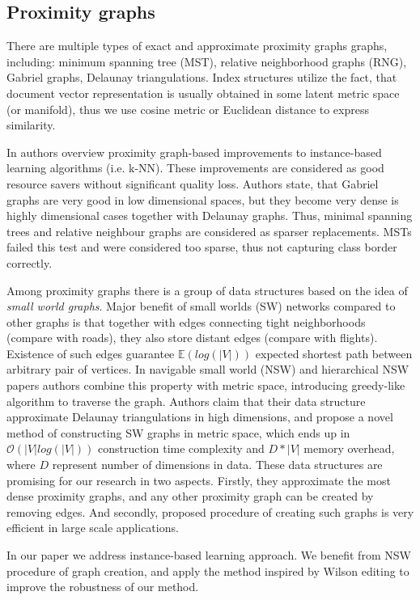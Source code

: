 
\subsection{Proximity graphs}

There are multiple types of exact and approximate proximity graphs graphs, including: minimum spanning tree (MST), relative neighborhood graphs (RNG), Gabriel graphs, Delaunay triangulations.
Index structures utilize the fact, that document vector representation is usually obtained in some latent metric space (or manifold), thus we use cosine metric or Euclidean distance to express similarity.

In \cite{ProximityGraphSurvey} authors overview proximity graph-based improvements to instance-based learning algorithms (i.e. k-NN). These improvements are considered as good resource savers without significant quality loss. Authors state, that Gabriel graphs are very good in low dimensional spaces, but they become very dense is highly dimensional cases together with Delaunay graphs. Thus, minimal spanning trees and relative neighbour graphs are considered as sparser replacements. MSTs failed this test and were considered too sparse, thus not capturing class border correctly.

Among proximity graphs there is a group of data structures based on the idea of \emph{small world graphs}. Major benefit of small worlds (SW) networks \cite{swg} compared to other graphs is that together with edges connecting tight neighborhoods (compare with roads), they also store distant edges (compare with flights). Existence of such edges guarantee $\mathbb{E}(log(|V|))$ expected shortest path between arbitrary pair of vertices. In navigable small world (NSW) \cite{nsw} and hierarchical NSW \cite{hnsw} papers authors combine this property with metric space, introducing greedy-like algorithm to traverse the graph. Authors claim that their data structure approximate Delaunay triangulations in high dimensions, and propose a novel method of constructing SW graphs in metric space, which ends up in $\mathcal{O}(|V|log(|V|))$ construction time complexity and $D*|V|$ memory overhead, where $D$ represent number of dimensions in data.
These data structures are promising for our research in two aspects. Firstly, they approximate the most dense proximity graphs, and any other proximity graph can be created by removing edges. And secondly, proposed procedure of creating such graphs is very efficient in large scale applications.

In our paper we address instance-based learning approach. We benefit from NSW procedure of graph creation, and apply the method inspired by Wilson editing to improve the robustness of our method.
